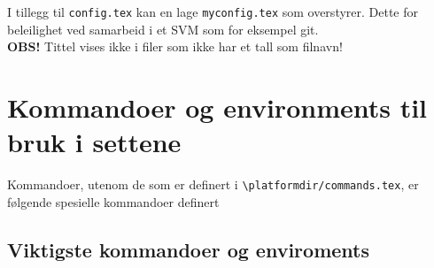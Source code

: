 \documentclass{article}
\def\platformdir{.}
\begin{document}
I tillegg til \lstinline{config.tex} kan en lage \lstinline{myconfig.tex} som overstyrer. Dette for beleilighet ved samarbeid i et SVM som for eksempel git.\\
\textbf{OBS!} Tittel vises ikke i filer som ikke har et tall som filnavn!
\clearpage
\section*{Kommandoer og environments til bruk i settene}

Kommandoer, utenom de som er definert i \lstinline{\platformdir/commands.tex}, er følgende spesielle kommandoer definert\\
\subsection*{Viktigste kommandoer og enviroments}
\end{document}
